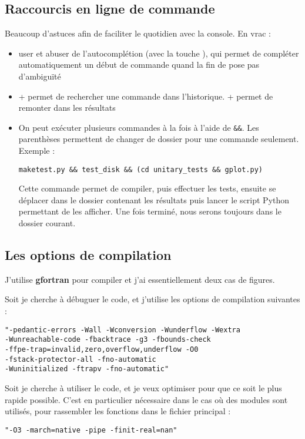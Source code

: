 \subsection{Raccourcis en ligne de commande}
Beaucoup d'astuces afin de faciliter le quotidien avec la console. En vrac : 
\begin{itemize}
\item user et abuser de l'autocomplétion (avec la touche ), qui permet de compléter automatiquement un début de commande quand la fin de pose pas d'ambiguïté
\item {} +  permet de rechercher une commande dans l'historique.  +  permet de remonter dans les résultats
\item On peut exécuter plusieurs commandes à la fois à l'aide de \verb|&&|. Les parenthèses permettent de changer de dossier pour une commande seulement. Exemple : \\
\begin{verbatim}
maketest.py && test_disk && (cd unitary_tests && gplot.py)
\end{verbatim}

Cette commande permet de compiler, puis effectuer les tests, ensuite se déplacer dans le dossier contenant les résultats puis lancer le script Python permettant de les afficher. Une fois terminé, nous serons toujours dans le dossier courant.
\end{itemize}

\subsection{Les options de compilation}
J'utilise \textbf{gfortran} pour compiler et j'ai essentiellement deux cas de figures. 

Soit je cherche à débuguer le code, et j'utilise les options de compilation suivantes : 
\begin{verbatim}
"-pedantic-errors -Wall -Wconversion -Wunderflow -Wextra 
-Wunreachable-code -fbacktrace -g3 -fbounds-check
-ffpe-trap=invalid,zero,overflow,underflow -O0
-fstack-protector-all -fno-automatic 
-Wuninitialized -ftrapv -fno-automatic"
\end{verbatim}

Soit je cherche à utiliser le code, et je veux optimiser pour que ce soit le plus rapide possible. C'est en particulier nécessaire dans le cas où des modules sont utilisés, pour rassembler les fonctions dans le fichier principal : 
\begin{verbatim}
"-O3 -march=native -pipe -finit-real=nan"
\end{verbatim}


